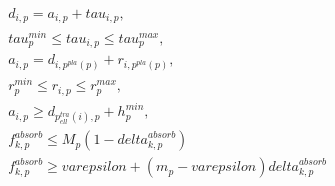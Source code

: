 \begin{align}
  & d_{i , p} = a_{i , p} + \mathit{tau}_{i , p} , \tag{eq\_0022} \\
  & \mathit{tau}_{p}^{min} \leq \mathit{tau}_{i , p} \leq \mathit{tau}_{p}^{max} , \tag{eq\_0023} \\
  & a_{i , p} = d_{i , p^{pla} \left(p\right)} + r_{i , p^{pla} \left(p\right)} , \tag{eq\_0024} \\
  & r_{p}^{min} \leq r_{i , p} \leq r_{p}^{max} , \tag{eq\_0027} \\
  & a_{i , p} \geq d_{p_{\mathit{ell}}^{tra} \left(i\right) , p} + h_{p}^{min} , \tag{eq\_0030} \\
  & f_{k , p}^{absorb} \leq M_{p} \left(1 - \mathit{delta}_{k , p}^{absorb}\right) \tag{eq\_0036\_a} \\
  & f_{k , p}^{absorb} \geq \mathit{varepsilon} + \left(m_{p} - \mathit{varepsilon}\right) \mathit{delta}_{k , p}^{absorb} \tag{eq\_0036\_b} \\
\end{align}
